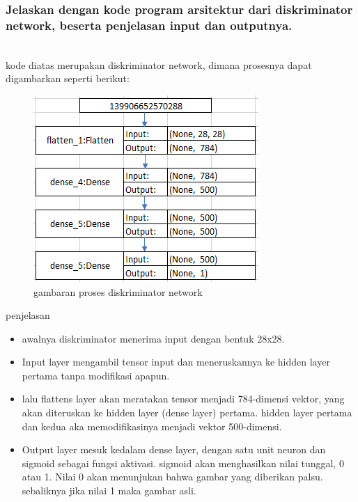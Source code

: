 \subsubsection{Jelaskan dengan kode program arsitektur dari diskriminator network, beserta penjelasan input dan outputnya.}
\hfill\\

kode diatas merupakan diskriminator network, dimana prosesnya dapat digambarkan seperti berikut:
\begin{figure}[H]
	\centering
	\includegraphics[scale=0.5]{figures/1174087/8/4a.png}
	\caption{gambaran proses diskriminator network}
\end{figure}
penjelasan
\begin{itemize}
	\item awalnya diskriminator menerima input dengan bentuk 28x28.
	\item Input layer mengambil tensor input dan meneruskannya ke hidden layer pertama tanpa modifikasi apapun.
	\item lalu flattens layer akan meratakan tensor menjadi 784-dimensi vektor, yang akan diteruskan ke hidden layer (dense layer) pertama. hidden layer pertama dan kedua aka memodifikasinya menjadi vektor 500-dimensi.
	\item Output layer mesuk kedalam dense layer, dengan satu unit neuron dan sigmoid sebagai fungsi aktivasi.  sigmoid akan menghasilkan nilai tunggal, 0 atau 1. Nilai 0 akan menunjukan bahwa gambar yang diberikan palsu. sebaliknya jika nilai 1 maka gambar asli.
\end{itemize}

